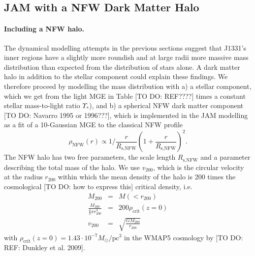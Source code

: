 \subsection{JAM with a NFW Dark Matter Halo}

\paragraph{Including a NFW halo.} The dynamical modelling attempts in the previous sections suggest that J1331's inner regions have a slightly more roundish and at large radii more massive mass distribution than expected from the distribution of stars alone. A dark matter halo in addition to the stellar component could explain these findings. We therefore proceed by modelling the mass distribution with a) a stellar component, which we get from the light MGE in Table [TO DO: REF????] times a constant stellar mass-to-light ratio $\Upsilon_*$), and b) a spherical NFW dark matter component [TO DO: Navarro 1995 or 1996???], which is implemented in the JAM modelling as a fit of a 10-Gaussian MGE to the classical NFW profile
\begin{equation*}
\rho_\text{NFW}(r) \propto 1 / \frac{r}{R_\text{s,NFW}} \left( 1 + \frac{r}{R_\text{s,NFW}} \right)^2.
\end{equation*}
The NFW halo has two free parameters, the scale length $R_\text{s,NFW}$ and a parameter describing the total mass of the halo. We use $v_\text{200}$, which is the circular velocity at the radius $r_\text{200}$ within which the mean density of the halo is 200 times the cosmological [TO DO: how to express this] critical density, i.e.
\begin{eqnarray*}
M_\text{200} &=& M(<r_{200})\\
\frac{M_{200}}{ \frac 43 \pi r_{200}^3} &=& 200 \rho_\text{crit}(z=0) \\
v_\text{200} &=& \sqrt{\frac{GM_{200}}{r_\text{200}}}
\end{eqnarray*}
with $\rho_\text{crit}(z=0)=1.43 \cdot 10^{-7} M_\odot / \text{pc}^3$ in the WMAP5 cosmology by [TO DO: REF: Dunkley et al. 2009].

